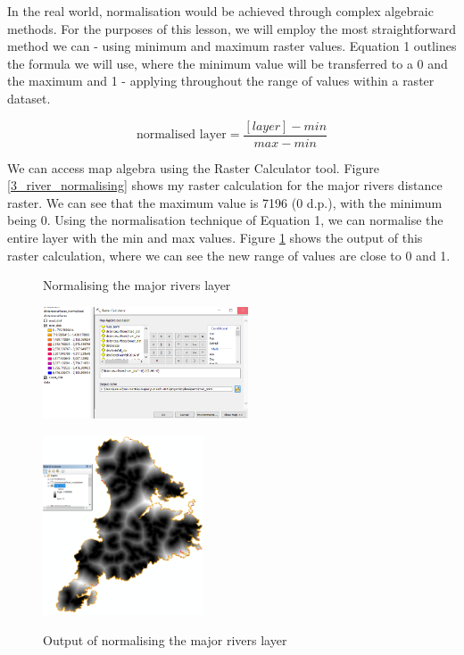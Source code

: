 \documentclass{article}
\begin{document}
In the real world, normalisation would be achieved through complex algebraic methods. For the purposes of this lesson, we will employ the most straightforward method we can - using minimum and maximum raster values. Equation 1 outlines the formula we will use, where the minimum value will be transferred to a 0 and the maximum and 1 - applying throughout the range of values within a raster dataset.

\begin{equation}
  \text{normalised layer} = \frac{[layer] - min}{max - min}
\end{equation}
\vspace{0.2cm}

We can access map algebra using the Raster Calculator tool. Figure \ref{3_river_normalising} shows my raster calculation for the major rivers distance raster. We can see that the maximum value is 7196 (0 d.p.), with the minimum being 0. Using the normalisation technique of Equation 1, we can normalise the entire layer with the min and max values. Figure \ref{3_river_normalising_output} shows the output of this raster calculation, where we can see the new range of values are close to 0 and 1.

\begin{figure}[h]
  \centering
  \begin{minipage}[b]{0.4\textwidth}
    \centering
    \caption{Normalising the major rivers layer}
    \includegraphics[width=230px]{images/part3/river_normalising.PNG}
    \label{3_river_normalising}
  \end{minipage}
  \hfill
  \begin{minipage}[b]{0.4\textwidth}
    \centering
    \caption{Output of normalising the major rivers layer}
    \includegraphics[width=180px]{images/part3/river_normalising_output.PNG}
    \label{3_river_normalising_output}
  \end{minipage}
\end{figure}
\end{document}
